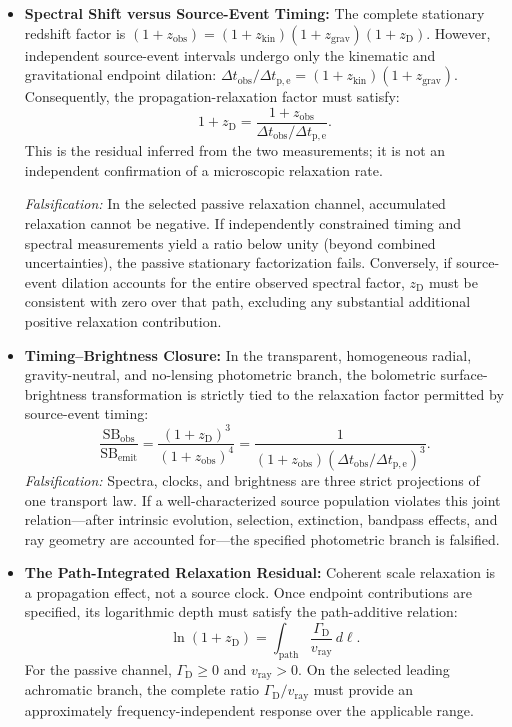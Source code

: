 \begin{itemize}
    \item \textbf{Spectral Shift versus Source-Event Timing:} The complete stationary redshift factor is $(1+z_{\mathrm{obs}}) = (1+z_{\mathrm{kin}})(1+z_{\mathrm{grav}})(1+z_{\mathrm D})$. However, independent source-event intervals undergo only the kinematic and gravitational endpoint dilation: $\Delta t_{\mathrm{obs}}/\Delta t_{\mathrm{p,e}} = (1+z_{\mathrm{kin}})(1+z_{\mathrm{grav}})$. Consequently, the propagation-relaxation factor must satisfy:
    \begin{equation}
        1+z_{\mathrm D} = \frac{1+z_{\mathrm{obs}}}{\Delta t_{\mathrm{obs}}/\Delta t_{\mathrm{p,e}}}.
    \end{equation}
    This is the residual inferred from the two measurements; it is not an independent confirmation of a microscopic relaxation rate.
    
    \textit{Falsification:} In the selected passive relaxation channel, accumulated relaxation cannot be negative. If independently constrained timing and spectral measurements yield a ratio below unity (beyond combined uncertainties), the passive stationary factorization fails. Conversely, if source-event dilation accounts for the entire observed spectral factor, $z_{\mathrm D}$ must be consistent with zero over that path, excluding any substantial additional positive relaxation contribution.

    \item \textbf{Timing--Brightness Closure:} In the transparent, homogeneous radial, gravity-neutral, and no-lensing photometric branch, the bolometric surface-brightness transformation is strictly tied to the relaxation factor permitted by source-event timing:
    \begin{equation}
        \frac{\mathrm{SB}_{\mathrm{obs}}}{\mathrm{SB}_{\mathrm{emit}}} = \frac{(1+z_{\mathrm D})^3}{(1+z_{\mathrm{obs}})^4} = \frac{1}{(1+z_{\mathrm{obs}}) \left(\Delta t_{\mathrm{obs}}/\Delta t_{\mathrm{p,e}}\right)^3}.
    \end{equation}
    \textit{Falsification:} Spectra, clocks, and brightness are three strict projections of one transport law. If a well-characterized source population violates this joint relation—after intrinsic evolution, selection, extinction, bandpass effects, and ray geometry are accounted for—the specified photometric branch is falsified.

    \item \textbf{The Path-Integrated Relaxation Residual:} Coherent scale relaxation is a propagation effect, not a source clock. Once endpoint contributions are specified, its logarithmic depth must satisfy the path-additive relation:
    \begin{equation}
        \ln(1+z_{\mathrm D}) = \int_{\mathrm{path}} \frac{\Gamma_{\mathrm D}}{v_{\mathrm{ray}}}\,d\ell.
    \end{equation}
    For the passive channel, $\Gamma_{\mathrm D}\geq0$ and $v_{\mathrm{ray}}>0$. On the selected leading achromatic branch, the complete ratio $\Gamma_{\mathrm D}/v_{\mathrm{ray}}$ must provide an approximately frequency-independent response over the applicable range.
    

\end{itemize}

